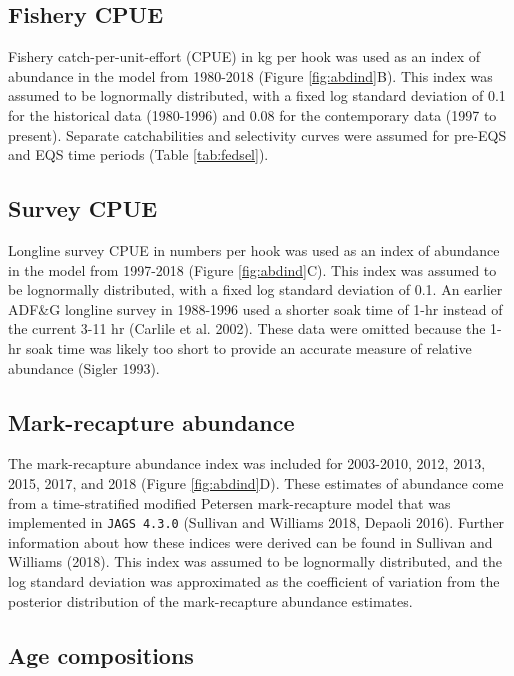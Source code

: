 \documentclass[]{article}
\begin{document}
\subsection{Fishery CPUE}\label{fishery-cpue}

Fishery catch-per-unit-effort (CPUE) in kg per hook was used as an index
of abundance in the model from 1980-2018 (Figure \ref{fig:abdind}B).
This index was assumed to be lognormally distributed, with a fixed log
standard deviation of 0.1 for the historical data (1980-1996) and 0.08
for the contemporary data (1997 to present). Separate catchabilities and
selectivity curves were assumed for pre-EQS and EQS time periods (Table
\ref{tab:fedsel}).

\subsection{Survey CPUE}\label{survey-cpue}

Longline survey CPUE in numbers per hook was used as an index of
abundance in the model from 1997-2018 (Figure \ref{fig:abdind}C). This
index was assumed to be lognormally distributed, with a fixed log
standard deviation of 0.1. An earlier ADF\&G longline survey in
1988-1996 used a shorter soak time of 1-hr instead of the current 3-11
hr (Carlile et al. 2002). These data were omitted because the 1-hr soak
time was likely too short to provide an accurate measure of relative
abundance (Sigler 1993).

\subsection{Mark-recapture abundance}\label{mark-recapture-abundance}

The mark-recapture abundance index was included for 2003-2010, 2012,
2013, 2015, 2017, and 2018 (Figure \ref{fig:abdind}D). These estimates
of abundance come from a time-stratified modified Petersen
mark-recapture model that was implemented in \texttt{JAGS\ 4.3.0}
(Sullivan and Williams 2018, Depaoli 2016). Further information about
how these indices were derived can be found in Sullivan and Williams
(2018). This index was assumed to be lognormally distributed, and the
log standard deviation was approximated as the coefficient of variation
from the posterior distribution of the mark-recapture abundance
estimates.

\subsection{Age compositions}\label{age-compositions}
\end{document}
